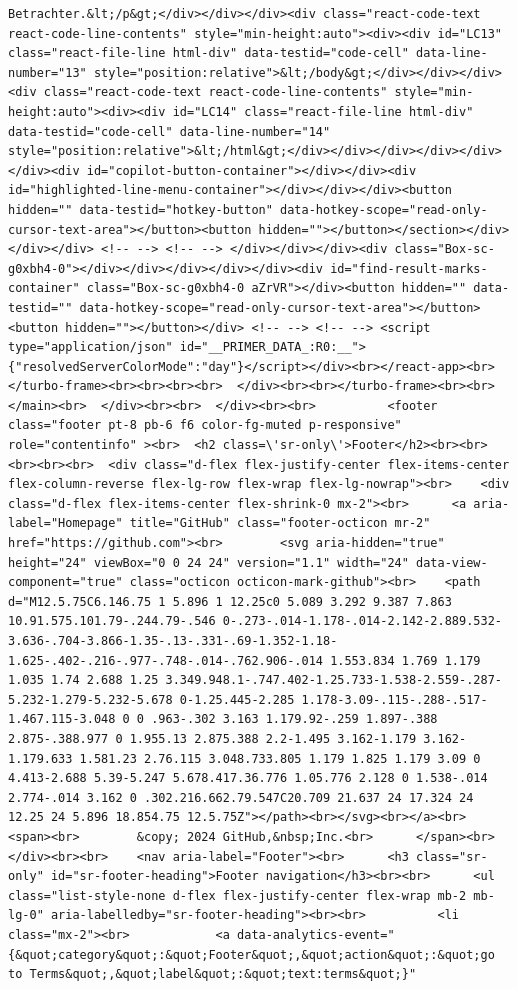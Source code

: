 \documentclass[
  letterpaper,
]{book}
\begin{document}
\begin{verbatim}
Betrachter.&lt;/p&gt;</div></div></div><div class="react-code-text react-code-line-contents" style="min-height:auto"><div><div id="LC13" class="react-file-line html-div" data-testid="code-cell" data-line-number="13" style="position:relative">&lt;/body&gt;</div></div></div><div class="react-code-text react-code-line-contents" style="min-height:auto"><div><div id="LC14" class="react-file-line html-div" data-testid="code-cell" data-line-number="14" style="position:relative">&lt;/html&gt;</div></div></div></div></div></div><div id="copilot-button-container"></div></div><div id="highlighted-line-menu-container"></div></div></div><button hidden="" data-testid="hotkey-button" data-hotkey-scope="read-only-cursor-text-area"></button><button hidden=""></button></section></div></div></div> <!-- --> <!-- --> </div></div></div><div class="Box-sc-g0xbh4-0"></div></div></div></div></div><div id="find-result-marks-container" class="Box-sc-g0xbh4-0 aZrVR"></div><button hidden="" data-testid="" data-hotkey-scope="read-only-cursor-text-area"></button><button hidden=""></button></div> <!-- --> <!-- --> <script type="application/json" id="__PRIMER_DATA_:R0:__">{"resolvedServerColorMode":"day"}</script></div><br></react-app><br></turbo-frame><br><br><br><br>  </div><br><br></turbo-frame><br><br>    </main><br>  </div><br><br>  </div><br><br>          <footer class="footer pt-8 pb-6 f6 color-fg-muted p-responsive" role="contentinfo" ><br>  <h2 class=\'sr-only\'>Footer</h2><br><br>  <br><br><br>  <div class="d-flex flex-justify-center flex-items-center flex-column-reverse flex-lg-row flex-wrap flex-lg-nowrap"><br>    <div class="d-flex flex-items-center flex-shrink-0 mx-2"><br>      <a aria-label="Homepage" title="GitHub" class="footer-octicon mr-2" href="https://github.com"><br>        <svg aria-hidden="true" height="24" viewBox="0 0 24 24" version="1.1" width="24" data-view-component="true" class="octicon octicon-mark-github"><br>    <path d="M12.5.75C6.146.75 1 5.896 1 12.25c0 5.089 3.292 9.387 7.863 10.91.575.101.79-.244.79-.546 0-.273-.014-1.178-.014-2.142-2.889.532-3.636-.704-3.866-1.35-.13-.331-.69-1.352-1.18-1.625-.402-.216-.977-.748-.014-.762.906-.014 1.553.834 1.769 1.179 1.035 1.74 2.688 1.25 3.349.948.1-.747.402-1.25.733-1.538-2.559-.287-5.232-1.279-5.232-5.678 0-1.25.445-2.285 1.178-3.09-.115-.288-.517-1.467.115-3.048 0 0 .963-.302 3.163 1.179.92-.259 1.897-.388 2.875-.388.977 0 1.955.13 2.875.388 2.2-1.495 3.162-1.179 3.162-1.179.633 1.581.23 2.76.115 3.048.733.805 1.179 1.825 1.179 3.09 0 4.413-2.688 5.39-5.247 5.678.417.36.776 1.05.776 2.128 0 1.538-.014 2.774-.014 3.162 0 .302.216.662.79.547C20.709 21.637 24 17.324 24 12.25 24 5.896 18.854.75 12.5.75Z"></path><br></svg><br></a><br>      <span><br>        &copy; 2024 GitHub,&nbsp;Inc.<br>      </span><br>    </div><br><br>    <nav aria-label="Footer"><br>      <h3 class="sr-only" id="sr-footer-heading">Footer navigation</h3><br><br>      <ul class="list-style-none d-flex flex-justify-center flex-wrap mb-2 mb-lg-0" aria-labelledby="sr-footer-heading"><br><br>          <li class="mx-2"><br>            <a data-analytics-event="{&quot;category&quot;:&quot;Footer&quot;,&quot;action&quot;:&quot;go to Terms&quot;,&quot;label&quot;:&quot;text:terms&quot;}" 
\end{verbatim}
\end{document}
